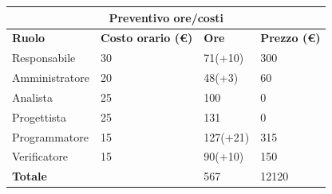 \documentclass[a4paper, 12pt]{article}
\begin{document}
\begin{center}
	\begin{tabularx}{\textwidth}{|X|X|X|X|}
		\hline
		\multicolumn{4}{|c|}{\textbf{Preventivo ore/costi}}                                      \\
		\hline
		\hline
		\textbf{Ruolo}  & \textbf{Costo orario (\euro)} & \textbf{Ore} & \textbf{Prezzo (\euro)} \\
		\hline
		Responsabile    & 30                            & 71(+10)       & 300                      \\
		\hline
		Amministratore  & 20                            & 48(+3)       & 60                      \\
		\hline
		Analista        & 25                            & 100       	& 0                     \\
		\hline
		Progettista     & 25                            & 131       & 0                     \\
		\hline
		Programmatore   & 15                            & 127(+21)      & 315                    \\
		\hline
		Verificatore    & 15                            & 90(+10)       & 150                      \\
		\hline
		\hline
		\textbf{Totale} &                               & 567          & 12120                    \\
		\hline
	\end{tabularx}\\[8pt]
	\mbox{}\\
\end{center}
\end{document}
